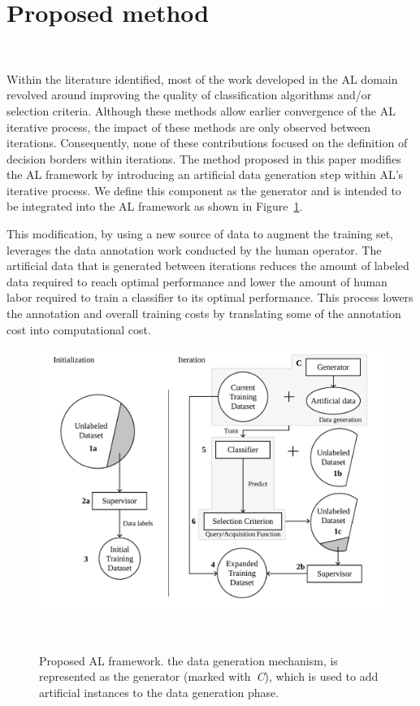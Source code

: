 \documentclass[remotesensing,article,submit,moreauthors,pdftex]{Definitions/mdpi}
\begin{document}
\section{Proposed method}~\label{sec:proposed-method}

Within the literature identified, most of the work developed in the AL domain
revolved around improving the quality of classification algorithms and/or
selection criteria. Although these methods allow earlier convergence of the
AL iterative process, the impact of these methods are only observed between
iterations. Consequently, none of these contributions focused on the
definition of decision borders within iterations. The method proposed in this
paper modifies the AL framework by introducing an artificial data generation
step within AL's iterative process. We define this component as the generator
and is intended to be integrated into the AL framework as shown in
Figure~\ref{fig:al_new}. 

This modification, by using a new source of data to augment the training set,
leverages the data annotation work conducted by the human operator. The
artificial data that is generated between iterations reduces the amount of
labeled data required to reach optimal performance and lower the amount of
human labor required to train a classifier to its optimal performance. This
process lowers the annotation and overall training costs by translating some
of the annotation cost into computational cost.

\begin{figure}[htb]
	\centering
	\includegraphics[width=\linewidth]{../analysis/al_new}
    \caption{
        Proposed AL framework. the data
        generation mechanism, is represented as the generator (marked
        with~\textit{C}), which is used to add artificial instances to the
        data generation phase. 
    }~\label{fig:al_new}
\end{figure}
\end{document}
